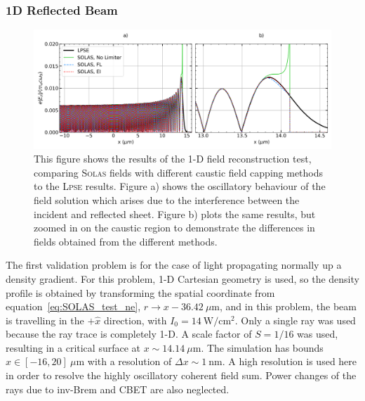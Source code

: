 \subsubsection{1D Reflected Beam}

\begin{figure}[t!]
    \includegraphics[width=\linewidth]{Numerics/Images/1d_field_capping.png}
    \centering
    \caption{This figure shows the results of the 1-D field reconstruction test, comparing \textsc{Solas} fields with different caustic field capping methods to the \textsc{Lpse} results.
    Figure a) shows the oscillatory behaviour of the field solution which arises due to the interference between the incident and reflected sheet.
    Figure b) plots the same results, but zoomed in on the caustic region to demonstrate the differences in fields obtained from the different methods.}%
    \label{fig:SOLAS_1d_field_test}
\end{figure}

The first validation problem is for the case of light propagating normally up a density gradient.
For this problem, 1-D Cartesian geometry is used, so the density profile is obtained by transforming the spatial coordinate from equation~\ref{eq:SOLAS_test_ne}, $r\rightarrow x-36.42\ \mu\text{m}$, and in this problem, the beam is travelling in the $+\hat{x}$ direction, with $I_0 = 14\ \text{W}/\text{cm}^{2}$.
Only a single ray was used because the ray trace is completely 1-D.
A scale factor of $S=1/16$ was used, resulting in a critical surface at $x\sim 14.14\ \mu\text{m}$.
The simulation has bounds $x\in [-16,20]\ \mu\text{m}$ with a resolution of $\Delta x\sim 1\ \text{nm}$.
A high resolution is used here in order to resolve the highly oscillatory coherent field sum.
Power changes of the rays due to \ac{inv-Brem} and \ac{CBET} are also neglected.


